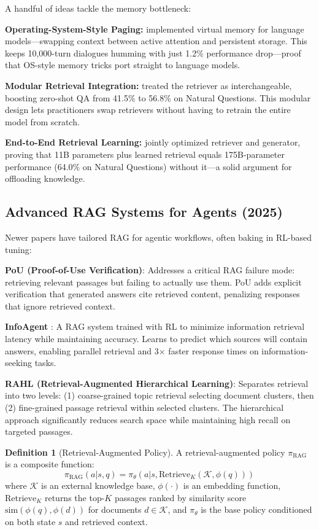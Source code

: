 \documentclass[12pt,a4paper]{report}
\theoremstyle{definition}
\newtheorem{definition}[theorem]{Definition}
\begin{document}
A handful of ideas tackle the memory bottleneck:

\textbf{Operating-System-Style Paging:} \citet{packer2023memgpt} implemented virtual memory for language models---swapping context between active attention and persistent storage. This keeps 10,000-turn dialogues humming with just 1.2\% performance drop---proof that OS-style memory tricks port straight to language models.

\textbf{Modular Retrieval Integration:} \citet{shi2023replug} treated the retriever as interchangeable, boosting zero-shot QA from 41.5\% to 56.8\% on Natural Questions. This modular design lets practitioners swap retrievers without having to retrain the entire model from scratch.

\textbf{End-to-End Retrieval Learning:} \citet{izacard2022atlas} jointly optimized retriever and generator, proving that 11B parameters plus learned retrieval equals 175B-parameter performance (64.0\% on Natural Questions) without it---a solid argument for offloading knowledge.

\subsection{Advanced RAG Systems for Agents (2025)}
\label{sec:rag_2025}

Newer papers have tailored RAG for agentic workflows, often baking in RL-based tuning:

\textbf{PoU (Proof-of-Use Verification)}: Addresses a critical RAG failure mode: retrieving relevant passages but failing to actually use them. PoU adds explicit verification that generated answers cite retrieved content, penalizing responses that ignore retrieved context.

\textbf{InfoAgent} \cite{zhang2025infoagent}: A RAG system trained with RL to minimize information retrieval latency while maintaining accuracy. Learns to predict which sources will contain answers, enabling parallel retrieval and 3$\times$ faster response times on information-seeking tasks.

\textbf{RAHL (Retrieval-Augmented Hierarchical Learning)}: Separates retrieval into two levels: (1) coarse-grained topic retrieval selecting document clusters, then (2) fine-grained passage retrieval within selected clusters. The hierarchical approach significantly reduces search space while maintaining high recall on targeted passages.

\begin{definition}[Retrieval-Augmented Policy]
\label{def:rap}
A retrieval-augmented policy $\pi_{\text{RAG}}$ is a composite function:
\begin{equation}
\pi_{\text{RAG}}(a | s, q) = \pi_\theta\left(a \Big| s, \text{Retrieve}_K\left(\mathcal{K}, \phi(q)\right)\right)
\end{equation}
where $\mathcal{K}$ is an external knowledge base, $\phi(\cdot)$ is an embedding function, $\text{Retrieve}_K$ returns the top-$K$ passages ranked by similarity score $\text{sim}(\phi(q), \phi(d))$ for documents $d \in \mathcal{K}$, and $\pi_\theta$ is the base policy conditioned on both state $s$ and retrieved context.
\end{definition}
\end{document}
